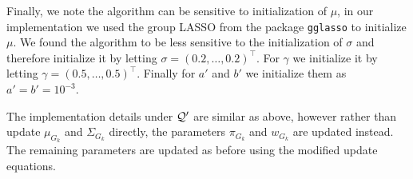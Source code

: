 Finally, we note the algorithm can be sensitive to initialization of $\mu$, in our implementation we used the group LASSO from the package \texttt{gglasso} to initialize $\mu$. We found the algorithm to be less sensitive to the initialization of $\sigma$ and therefore initialize it by letting $\sigma = (0.2,\dots, 0.2)^\top$. For $\gamma$ we initialize it by letting $\gamma = (0.5, \dots, 0.5)^\top$. Finally for $a'$ and $b'$ we initialize them as $a' = b' = 10^{-3}$.

The implementation details under $\mathcal{Q}'$ are similar as above, however rather than update $\mu_{G_k}$ and $\Sigma_{G_k}$ directly, the parameters $\pi_{G_k}$ and $w_{G_k}$ are updated instead. The remaining parameters are updated as before using the modified update equations.

